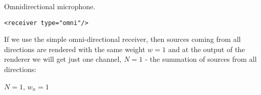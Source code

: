 Omnidirectional microphone.

\begin{lstlisting}[numbers=none]
<receiver type="omni"/>
\end{lstlisting}

If we use the simple omni-directional receiver, then sources coming
from all directions are rendered with the same weight $w=1$ and at the
output of the renderer we will get just one channel, $N=1$ - the
summation of sources from all directions:

$N=1$,
$w_n=1$


